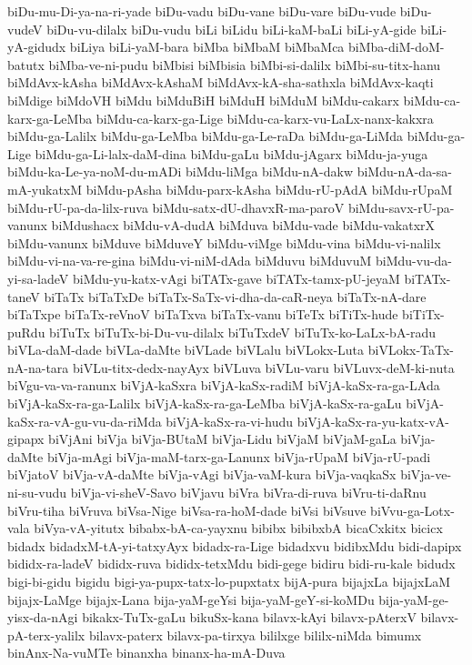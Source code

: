 {biDu-mu-Di-ya-na-ri-yade
biDu-vadu
biDu-vane
biDu-vare
biDu-vude
biDu-vudeV
biDu-vu-dilalx
biDu-vudu
biLi
biLidu
biLi-kaM-baLi
biLi-yA-gide
biLi-yA-gidudx
biLiya
biLi-yaM-bara
biMba
biMbaM
biMbaMca
biMba-diM-doM-batutx
biMba-ve-ni-pudu
biMbisi
biMbisia
biMbi-si-dalilx
biMbi-su-titx-hanu
biMdAvx-kAsha
biMdAvx-kAshaM
biMdAvx-kA-sha-sathxla
biMdAvx-kaqti
biMdige
biMdoVH
biMdu
biMduBiH
biMduH
biMduM
biMdu-cakarx
biMdu-ca-karx-ga-LeMba
biMdu-ca-karx-ga-Lige
biMdu-ca-karx-vu-LaLx-nanx-kakxra
biMdu-ga-Lalilx
biMdu-ga-LeMba
biMdu-ga-Le-raDa
biMdu-ga-LiMda
biMdu-ga-Lige
biMdu-ga-Li-lalx-daM-dina
biMdu-gaLu
biMdu-jAgarx
biMdu-ja-yuga
biMdu-ka-Le-ya-noM-du-mADi
biMdu-liMga
biMdu-nA-dakw
biMdu-nA-da-sa-mA-yukatxM
biMdu-pAsha
biMdu-parx-kAsha
biMdu-rU-pAdA
biMdu-rUpaM
biMdu-rU-pa-da-lilx-ruva
biMdu-satx-dU-dhavxR-ma-paroV
biMdu-savx-rU-pa-vanunx
biMdushacx
biMdu-vA-dudA
biMduva
biMdu-vade
biMdu-vakatxrX
biMdu-vanunx
biMduve
biMduveY
biMdu-viMge
biMdu-vina
biMdu-vi-nalilx
biMdu-vi-na-va-re-gina
biMdu-vi-niM-dAda
biMduvu
biMduvuM
biMdu-vu-da-yi-sa-ladeV
biMdu-yu-katx-vAgi
biTATx-gave
biTATx-tamx-pU-jeyaM
biTATx-taneV
biTaTx
biTaTxDe
biTaTx-SaTx-vi-dha-da-caR-neya
biTaTx-nA-dare
biTaTxpe
biTaTx-reVnoV
biTaTxva
biTaTx-vanu
biTeTx
biTiTx-hude
biTiTx-puRdu
biTuTx
biTuTx-bi-Du-vu-dilalx
biTuTxdeV
biTuTx-ko-LaLx-bA-radu
biVLa-daM-dade
biVLa-daMte
biVLade
biVLalu
biVLokx-Luta
biVLokx-TaTx-nA-na-tara
biVLu-titx-dedx-nayAyx
biVLuva
biVLu-varu
biVLuvx-deM-ki-nuta
biVgu-va-va-ranunx
biVjA-kaSxra
biVjA-kaSx-radiM
biVjA-kaSx-ra-ga-LAda
biVjA-kaSx-ra-ga-Lalilx
biVjA-kaSx-ra-ga-LeMba
biVjA-kaSx-ra-gaLu
biVjA-kaSx-ra-vA-gu-vu-da-riMda
biVjA-kaSx-ra-vi-hudu
biVjA-kaSx-ra-yu-katx-vA-gipapx
biVjAni
biVja
biVja-BUtaM
biVja-Lidu
biVjaM
biVjaM-gaLa
biVja-daMte
biVja-mAgi
biVja-maM-tarx-ga-Lanunx
biVja-rUpaM
biVja-rU-padi
biVjatoV
biVja-vA-daMte
biVja-vAgi
biVja-vaM-kura
biVja-vaqkaSx
biVja-ve-ni-su-vudu
biVja-vi-sheV-Savo
biVjavu
biVra
biVra-di-ruva
biVru-ti-daRnu
biVru-tiha
biVruva
biVsa-Nige
biVsa-ra-hoM-dade
biVsi
biVsuve
biVvu-ga-Lotx-vala
biVya-vA-yitutx
bibabx-bA-ca-yayxnu
bibibx
bibibxbA
bicaCxkitx
bicicx
bidadx
bidadxM-tA-yi-tatxyAyx
bidadx-ra-Lige
bidadxvu
bidibxMdu
bidi-dapipx
bididx-ra-ladeV
bididx-ruva
bididx-tetxMdu
bidi-gege
bidiru
bidi-ru-kale
bidudx
bigi-bi-gidu
bigidu
bigi-ya-pupx-tatx-lo-pupxtatx
bijA-pura
bijajxLa
bijajxLaM
bijajx-LaMge
bijajx-Lana
bija-yaM-geYsi
bija-yaM-geY-si-koMDu
bija-yaM-ge-yisx-da-nAgi
bikakx-TuTx-gaLu
bikuSx-kana
bilavx-kAyi
bilavx-pAterxV
bilavx-pA-terx-yalilx
bilavx-paterx
bilavx-pa-tirxya
bililxge
bililx-niMda
bimumx
binAnx-Na-vuMTe
binanxha
binanx-ha-mA-Duva
}
